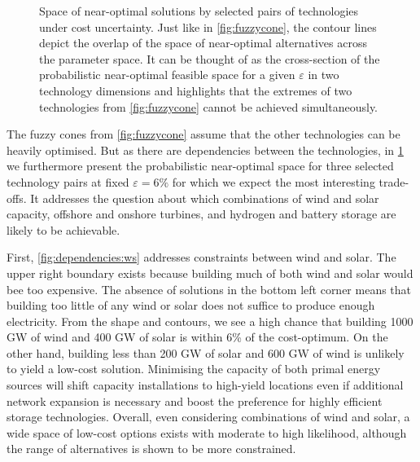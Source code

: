 \begin{figure}
    \noindent{}
    \caption{
      Space of near-optimal solutions by selected pairs of technologies under cost uncertainty.
    Just like in \cref{fig:fuzzycone}, the contour lines depict the overlap of the space of near-optimal alternatives across the parameter space.
    It can be thought of as the cross-section of the probabilistic near-optimal feasible space for a given $\varepsilon$
    in two technology dimensions and highlights that the extremes of two technologies from \cref{fig:fuzzycone} cannot be achieved simultaneously.
    }
    \label{fig:dependencies}
\end{figure}

The fuzzy cones from \cref{fig:fuzzycone} assume that the other technologies can be heavily optimised.
But as there are dependencies between the technologies, in \cref{fig:dependencies}
we furthermore present the probabilistic near-optimal space for three selected technology
pairs at fixed $\varepsilon=6\%$ for which we expect the most interesting trade-offs.
It addresses the question about which combinations of wind and solar capacity,
offshore and onshore turbines, and hydrogen and battery storage are likely to be achievable.

First, \cref{fig:dependencies:ws} addresses constraints between wind and solar.
The upper right boundary exists because building much of both wind and solar would bee too expensive.
The absence of solutions in the bottom left corner means that
building too little of any wind or solar does not suffice to produce enough electricity.
From the shape and contours, we see a high chance
that building 1000 GW of wind and 400 GW of solar is within 6\% of the cost-optimum.
On the other hand, building less than 200 GW of solar and 600 GW of wind is unlikely to yield a low-cost solution.
Minimising the capacity of both primal energy sources will shift capacity installations to
high-yield locations even if additional network expansion is necessary and boost
the preference for highly efficient storage technologies.
Overall, even considering combinations of wind and solar,
a wide space of low-cost options exists with moderate to high likelihood,
although the range of alternatives is shown to be more constrained.

